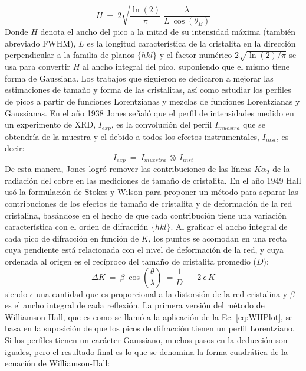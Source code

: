 \begin{equation}
  H \ = \ 2 \sqrt{\frac{\ln(2)}{\pi}} \ \frac{\lambda}{L \ \cos(\theta_B)}
  \label{eq:Scherrer}
\end{equation}
\noindent
Donde $H$ denota el ancho del pico a la mitad de su intensidad máxima (también abreviado FWHM), $L$ es la longitud característica de la cristalita en la dirección perpendicular a la familia de planos $\{hkl\}$ y el factor numérico $2\sqrt{\ln(2)/\pi}$ se usa para convertir $H$ al ancho integral del pico, suponiendo que el mismo tiene forma de Gaussiana.
Los trabajos que siguieron se dedicaron a mejorar las estimaciones de tamaño y forma de las cristalitas, así como estudiar los perfiles de picos a partir de funciones Lorentzianas y mezclas de funciones Lorentzianas y Gaussianas.
En el año 1938 Jones\cite{Jones16} señaló que el perfil de intensidades medido en un experimento de XRD, $I_{exp}$, es la convolución del perfil $I_{muestra}$ que se obtendría de la muestra y el debido a todos los efectos instrumentales, $I_{inst}$, es decir:
\begin{equation}
  I_{exp} \ = \ I_{muestra} \ \otimes \ I_{inst}
  \label{eq:conv}
\end{equation}
\noindent
De esta manera, Jones logró remover las contribuciones de las líneas $K\alpha_2$ de la radiación del cobre en las mediciones de tamaño de cristalita.
En el año 1949 Hall\cite{WHHall1949} usó la formulación de Stokes y Wilson para proponer un método para separar las contribuciones de los efectos de tamaño de cristalita y de deformación de la red cristalina, basándose en el hecho de que cada contribución tiene una variación característica con el orden de difracción $\{hkl\}$.
Al graficar el ancho integral de cada pico de difracción en función de $K$, los puntos se acomodan en una recta cuya pendiente está relacionada con el nivel de deformación de la red, y cuya ordenada al origen es el recíproco del tamaño de cristalita promedio ($D$):
\begin{equation}
  \Delta K \ = \  \beta \ \cos\left(\frac{\theta}{\lambda}\right) \ = \frac{1}{D} \ + \ 2 \ \epsilon \ K
  \label{eq:WHPlot}
\end{equation}
\noindent
siendo $\epsilon$ una cantidad que es proporcional a la distorsión de la red cristalina y $\beta$ es el ancho integral de cada reflexión.
La primera versión del método de Williamson-Hall, que es como se llamó a la aplicación de la Ec. \ref{eq:WHPlot}, se basa en la suposición de que los picos de difracción tienen un perfil Lorentziano.
Si los perfiles tienen un carácter Gaussiano, muchos pasos en la deducción son iguales, pero el resultado final es lo que se denomina la forma cuadrática de la ecuación de Williamson-Hall\cite{Scardi2004}:

